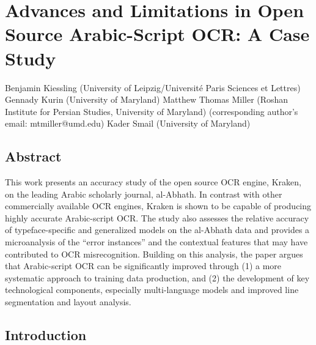 ﻿\chapter{Advances and Limitations in Open Source Arabic-Script OCR: A Case Study}
\label{ch:champs}
Benjamin Kiessling (University of Leipzig/Université Paris Sciences et Lettres)
Gennady Kurin (University of Maryland)
Matthew Thomas Miller (Roshan Institute for Persian Studies, University of Maryland) (corresponding author’s email: mtmiller@umd.edu)
Kader Smail (University of Maryland)

\section{Abstract}

This work presents an accuracy study of the open source OCR engine, Kraken, on
the leading Arabic scholarly journal, al-Abhath. In contrast with other
commercially available OCR engines, Kraken is shown to be capable of producing
highly accurate Arabic-script OCR. The study also assesses the relative
accuracy of typeface-specific and generalized models on the al-Abhath data and
provides a microanalysis of the “error instances” and the contextual features
that may have contributed to OCR misrecognition. Building on this analysis, the
paper argues that Arabic-script OCR can be significantly improved through (1) a
more systematic approach to training data production, and (2) the development
of key technological components, especially multi-language models and improved
line segmentation and layout analysis.  

\section{Introduction}

